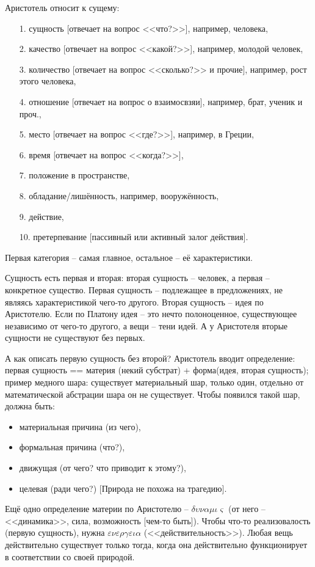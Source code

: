 \documentclass[a4paper, 12pt]{article} %
\begin{document}
Аристотель относит к сущему:
\begin{itemize}
\item[1.] сущность [отвечает на вопрос <<что?>>], например, человека,
\item[2.] качество [отвечает на вопрос <<какой?>>], например, молодой человек,
\item[3.] количество [отвечает на вопрос <<сколько?>> и прочие], например, рост этого человека,
\item[4.] отношение [отвечает на вопрос о взаимосвзяи], например, брат, ученик и проч.,
\item[5.] место [отвечает на вопрос <<где?>>], например, в Греции,
\item[6.] время [отвечает на вопрос <<когда?>>],
\item[7.] положение в пространстве,
\item[8.] обладание/лишённость, например, вооружённость,
\item[9.] действие,
\item[10.] претерпевание [пассивный или активный залог действия].
\end{itemize}


Первая категория -- самая главное, остальное -- её характеристики.

Сущность есть первая и вторая: вторая сущность -- человек, а первая -- конкретное существо. Первая сущность -- подлежащее в предложениях, не являясь характеристикой чего-то другого. Вторая сущность -- идея по Аристотелю. Если по Платону идея -- это нечто полоноценное, существующее независимо от чего-то другого, а вещи -- тени идей. А у Аристотеля вторые сущности не существуют без первых. 

А как описать первую сущность без второй? Аристотель вводит определение: первая сущность == материя (некий субстрат) + форма(идея, вторая сущность); пример медного шара: существует материальный шар, только один, отдельно от математической абстрации шара он не существует.
Чтобы появился такой шар, должна быть:
\begin{itemize}
\item материальная причина (из чего),
\item формальная причина (что?),
\item движущая (от чего? что приводит к этому?), 
\item целевая (ради чего?) [Природа не похожа на трагедию].
\end{itemize}

Ещё одно определение материи по Аристотелю -- $\delta \upsilon \nu \alpha \mu \iota \varsigma$ (от него -- <<динамика>>, сила, возможность [чем-то быть]). Чтобы что-то реализовалость (первую сущность), нужна $	\varepsilon \nu \varepsilon \rho \gamma \varepsilon \iota \alpha$ (<<действительность>>). Любая вещь действительно существует только тогда, когда она действительно функционирует в соответствии со своей природой.
\end{document}

